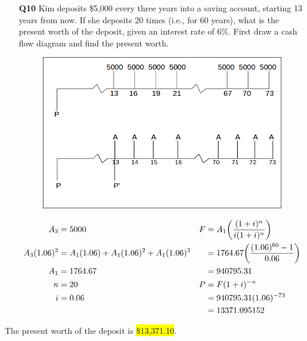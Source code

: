 \documentclass[12pt]{article}
\newcommand{\hilight}[1]{\colorbox{yellow}{#1}}
\begin{document}
\begin{itemize}
\item[\textbf{Q10}] Kim deposits \$5,000 every three years into a saving account, starting 13 years from now. If she deposits 20 times (i.e., for 60 years), what is the present worth of the deposit, given an interest rate of 6\%. First draw a cash flow diagram and find the present worth.
\begin{figure}[ht]
\centering
\includegraphics[width=15cm]{cashflow.png}
\end{figure}
\begin{align*}
A_3 &= 5000 &\vspace{20pt} F &= A_1 \bigg ( \frac{(1+i)^n}{i(1+i)^n} \bigg )\\
A_3(1.06)^3 &= A_1(1.06) + A_1(1.06)^2 + A_1(1.06)^3 & &= 1764.67 \bigg ( \frac{(1.06)^{60}-1}{0.06} \bigg )\\
A_1 &= 1764.67 & &=940795.31 \\
n &= 20 & P&=F(1+i)^{-n} \\
i &= 0.06 & &=940795.31(1.06)^{-73} \\
& & &= 13371.095152
\end{align*}
\end{itemize}
The present worth of the deposit is \hilight{\$13,371.10}.
\newpage
\end{document}
